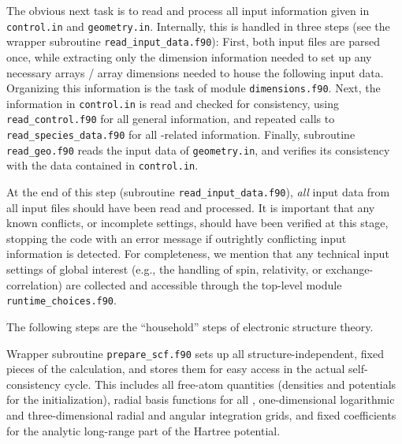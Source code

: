 The obvious next task is to read and process all input information
given in \texttt{control.in} and \texttt{geometry.in}. Internally,
this is handled in three steps (see the wrapper subroutine
\texttt{read\_input\_data.f90}): First, both input files are parsed once,
while extracting only the dimension information needed to set up any
necessary arrays / array dimensions needed to house the following
input data. Organizing this information is the task of module
\texttt{dimensions.f90}. Next, the information in \texttt{control.in}
is read and checked for consistency, using \texttt{read\_control.f90}
for all general information, and repeated calls to
\texttt{read\_species\_data.f90} for all -related
information. Finally, subroutine \texttt{read\_geo.f90} reads the
input data of \texttt{geometry.in}, and verifies its consistency with
the data contained in \texttt{control.in}.

At the end of this step (subroutine \texttt{read\_input\_data.f90}),
\emph{all} input data from all input files should have been read and
processed. It is important that any known conflicts, or incomplete
settings, should have been verified at this stage, stopping the code
with an error message if outrightly conflicting input information is
detected. For completeness, we mention that any technical input
settings of global interest (e.g., the handling of spin, relativity,
or exchange-correlation) are collected and accessible through the
top-level module \texttt{runtime\_choices.f90}. 

The following steps are the ``household'' steps of electronic
structure theory. 

Wrapper subroutine \texttt{prepare\_scf.f90} sets up
all structure-independent, fixed pieces of the calculation, and stores
them for easy access in the actual self-consistency cycle. This
includes all free-atom quantities (densities and potentials for the
initialization), radial basis functions for all ,
one-dimensional logarithmic and three-dimensional radial and angular
integration grids, and fixed coefficients for the analytic long-range
part of the Hartree potential.

